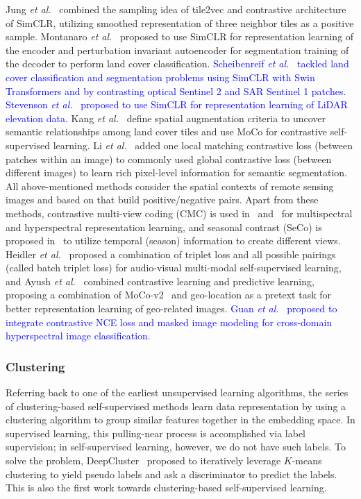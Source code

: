 \documentclass[lettersize,journal]{IEEEtran}
\newcommand{\etal}{\textit{et al.}}
\begin{document}
Jung \etal~\cite{jung2021contrastive} combined the sampling idea of tile2vec and contrastive architecture of SimCLR, utilizing smoothed representation of three neighbor tiles as a positive sample. Montanaro \etal~\cite{montanaro2021self} proposed to use SimCLR for representation learning of the encoder and perturbation invariant autoencoder for segmentation training of the decoder to perform land cover classification. 
\textcolor{blue}{Scheibenreif \etal~\cite{scheibenreif2022self} tackled land cover classification and segmentation problems using SimCLR with Swin Transformers and by contrasting optical Sentinel 2 and SAR Sentinel 1 patches. Stevenson \etal~\cite{stevenson2022deep} proposed to use SimCLR for representation learning of LiDAR elevation data.} 
Kang \etal~\cite{kang2020deep} define spatial augmentation criteria to uncover semantic relationships among land cover tiles and use MoCo for contrastive self-supervised learning. Li \etal~\cite{li2021remote} added one local matching contrastive loss (between patches within an image) to commonly used global contrastive loss (between different images) to learn rich pixel-level information for semantic segmentation. All above-mentioned methods consider the spatial contexts of remote sensing images and based on that build positive/negative pairs. Apart from these methods, contrastive multi-view coding (CMC) is used in~\cite{stojnic2021self,chen2021self1} and~\cite{liu2020deep} for multispectral and hyperspectral representation learning, and seasonal contrast (SeCo) is proposed in~\cite{manas2021seasonal} to utilize temporal (season) information to create different views. Heidler \etal~\cite{heidler2021self} proposed a combination of triplet loss and all possible pairings (called batch triplet loss) for audio-visual multi-modal self-supervised learning, and Ayush \etal~\cite{ayush2020geography} combined contrastive learning and predictive learning, proposing a combination of MoCo-v2~\cite{chen2020improved} and geo-location as a pretext task for better representation learning of geo-related images. 
\textcolor{blue}{Guan \etal~\cite{guan2022cross} proposed to integrate contrastive NCE loss and masked image modeling for cross-domain hyperspectral image classification.}
   
\subsubsection{Clustering}

Referring back to one of the earliest unsupervised learning algorithms, the series of clustering-based self-supervised methods learn data representation by using a clustering algorithm to group similar features together in the embedding space. In supervised learning, this pulling-near process is accomplished via label supervision; in self-supervised learning, however, we do not have such labels. To solve the problem, DeepCluster~\cite{caron2018deep} proposed to iteratively leverage $K$-means clustering to yield pseudo labels and ask a discriminator to predict the labels. This is also the first work towards clustering-based self-supervised learning.
\end{document}
